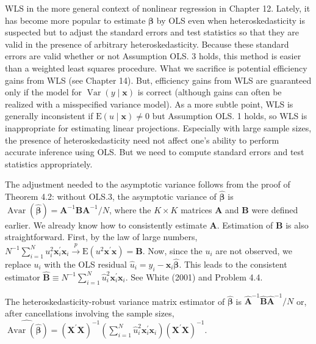 \documentclass[10pt]{article}
\begin{document}
WLS in the more general context of nonlinear regression in Chapter 12. Lately, it has become more popular to estimate $\boldsymbol{\beta}$ by OLS even when heteroskedasticity is suspected but to adjust the standard errors and test statistics so that they are valid in the presence of arbitrary heteroskedasticity. Because these standard errors are valid whether or not Assumption OLS. 3 holds, this method is easier than a weighted least squares procedure. What we sacrifice is potential efficiency gains from WLS (see Chapter 14). But, efficiency gains from WLS are guaranteed only if the model for $\operatorname{Var}(y \mid \mathbf{x})$ is correct (although gains can often be realized with a misspecified variance model). As a more subtle point, WLS is generally inconsistent if $\mathrm{E}(u \mid \mathbf{x}) \neq 0$ but Assumption OLS. 1 holds, so WLS is inappropriate for estimating linear projections. Especially with large sample sizes, the presence of heteroskedasticity need not affect one's ability to perform accurate inference using OLS. But we need to compute standard errors and test statistics appropriately.

The adjustment needed to the asymptotic variance follows from the proof of Theorem 4.2: without OLS.3, the asymptotic variance of $\hat{\boldsymbol{\beta}}$ is $\operatorname{Avar}(\hat{\boldsymbol{\beta}})=\mathbf{A}^{-1} \mathbf{B A}^{-1} / N$, where the $K \times K$ matrices $\mathbf{A}$ and $\mathbf{B}$ were defined earlier. We already know how to consistently estimate $\mathbf{A}$. Estimation of $\mathbf{B}$ is also straightforward. First, by the law of large numbers, $N^{-1} \sum_{i=1}^{N} u_{i}^{2} \mathbf{x}_{i}^{\prime} \mathbf{x}_{i} \xrightarrow{p} \mathrm{E}\left(u^{2} \mathbf{x}^{\prime} \mathbf{x}\right)=\mathbf{B}$. Now, since the $u_{i}$ are not observed, we replace $u_{i}$ with the OLS residual $\hat{u}_{i}=y_{i}-\mathbf{x}_{i} \hat{\boldsymbol{\beta}}$. This leads to the consistent estimator $\hat{\mathbf{B}} \equiv N^{-1} \sum_{i=1}^{N} \hat{u}_{i}^{2} \mathbf{x}_{i}^{\prime} \mathbf{x}_{i}$. See White (2001) and Problem 4.4.

The heteroskedasticity-robust variance matrix estimator of $\hat{\boldsymbol{\beta}}$ is $\hat{\mathbf{A}}^{-1} \hat{\mathbf{B}} \hat{\mathbf{A}}^{-1} / N$ or, after cancellations involving the sample sizes,\\
$\widehat{\operatorname{Avar}(\hat{\boldsymbol{\beta}})}=\left(\mathbf{X}^{\prime} \mathbf{X}\right)^{-1}\left(\sum_{i=1}^{N} \hat{u}_{i}^{2} \mathbf{x}_{i}^{\prime} \mathbf{x}_{i}\right)\left(\mathbf{X}^{\prime} \mathbf{X}\right)^{-1}$.
\end{document}
